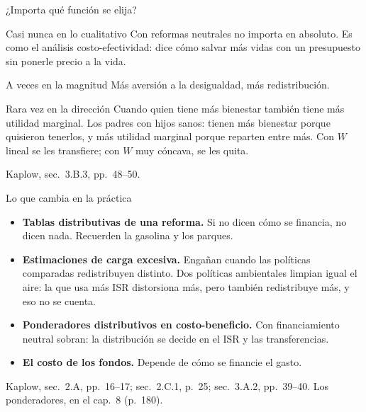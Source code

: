 \documentclass[aspectratio=169,11pt]{beamer}
\newcommand{\fuente}[1]{\par\vfill{\small\color{cGris}#1\par}}
\begin{document}
\begin{frame}{¿Importa qué función se elija?}
  \begin{block}{Casi nunca en lo cualitativo}
    Con reformas neutrales no importa en absoluto. Es como el análisis costo-efectividad: dice cómo salvar más vidas con un presupuesto sin ponerle precio a la vida.
  \end{block}
  \pause
  \begin{block}{A veces en la magnitud}
    Más aversión a la desigualdad, más redistribución.
  \end{block}
  \pause
  \begin{block}{Rara vez en la dirección}
    Cuando quien tiene más bienestar también tiene más utilidad marginal. Los padres con hijos sanos: tienen más bienestar porque quisieron tenerlos, y más utilidad marginal porque reparten entre más. Con $W$ lineal se les transfiere; con $W$ muy cóncava, se les quita.
  \end{block}
  \fuente{Kaplow, sec.~3.B.3, pp.~48--50.}
\end{frame}

\begin{frame}{Lo que cambia en la práctica}
  \begin{itemize}
    \item \textbf{Tablas distributivas de una reforma.} Si no dicen cómo se financia, no dicen nada. Recuerden la gasolina y los parques.
    \pause
    \item \textbf{Estimaciones de carga excesiva.} Engañan cuando las políticas comparadas redistribuyen distinto. Dos políticas ambientales limpian igual el aire: la que usa más ISR distorsiona más, pero también redistribuye más, y eso no se cuenta.
    \pause
    \item \textbf{Ponderadores distributivos en costo-beneficio.} Con financiamiento neutral sobran: la distribución se decide en el ISR y las transferencias.
    \pause
    \item \textbf{El costo de los fondos.} Depende de cómo se financie el gasto.
  \end{itemize}
  \fuente{Kaplow, sec.~2.A, pp.~16--17; sec.~2.C.1, p.~25; sec.~3.A.2, pp.~39--40. Los ponderadores, en el cap.~8 (p.~180).}
\end{frame}

\end{document}
